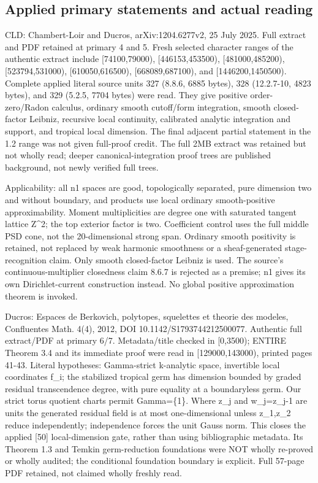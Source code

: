 \documentclass[11pt]{article}
\begin{document}
\subsection*{Applied primary statements and actual reading}

CLD: Chambert-Loir and Ducros, arXiv:1204.6277v2, 25 July 2025. Full extract and PDF retained at primary 4 and 5. Fresh selected character ranges of the authentic extract include [74100,79000), [446153,453500), [481000,485200), [523794,531000), [610050,616500), [668089,687100), and [1446200,1450500). Complete applied literal source units 327 (8.8.6, 6885 bytes), 328 (12.2.7-10, 4823 bytes), and 329 (5.2.5, 7704 bytes) were read. They give positive order-zero/Radon calculus, ordinary smooth cutoff/form integration, smooth closed-factor Leibniz, recursive local continuity, calibrated analytic integration and support, and tropical local dimension. The final adjacent partial statement in the 1.2 range was not given full-proof credit. The full 2MB extract was retained but not wholly read; deeper canonical-integration proof trees are published background, not newly verified full trees.

Applicability: all n1 spaces are good, topologically separated, pure dimension two and without boundary, and products use local ordinary smooth-positive approximability. Moment multiplicities are degree one with saturated tangent lattice Z\textasciicircum{}2; the top exterior factor is two. Coefficient control uses the full middle PSD cone, not the 20-dimensional strong span. Ordinary smooth positivity is retained, not replaced by weak harmonic smoothness or a sheaf-generated stage-recognition claim. Only smooth closed-factor Leibniz is used. The source's continuous-multiplier closedness claim 8.6.7 is rejected as a premise; n1 gives its own Dirichlet-current construction instead. No global positive approximation theorem is invoked.

Ducros: Espaces de Berkovich, polytopes, squelettes et theorie des modeles, Confluentes Math. 4(4), 2012, DOI 10.1142/S1793744212500077. Authentic full extract/PDF at primary 6/7. Metadata/title checked in [0,3500); ENTIRE Theorem 3.4 and its immediate proof were read in [129000,143000), printed pages 41-43. Literal hypotheses: Gamma-strict k-analytic space, invertible local coordinates f\_i; the stabilized tropical germ has dimension bounded by graded residual transcendence degree, with pure equality at a boundaryless germ. Our strict torus quotient charts permit Gamma=\{1\}. Where z\_j and w\_j=z\_j-1 are units the generated residual field is at most one-dimensional unless z\_1,z\_2 reduce independently; independence forces the unit Gauss norm. This closes the applied [50] local-dimension gate, rather than using bibliographic metadata. Its Theorem 1.3 and Temkin germ-reduction foundations were NOT wholly re-proved or wholly audited; the conditional foundation boundary is explicit. Full 57-page PDF retained, not claimed wholly freshly read.
\end{document}
